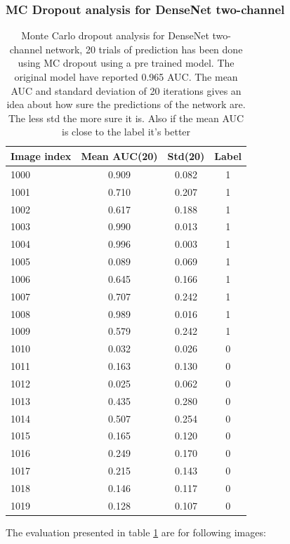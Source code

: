 \subsubsection{MC Dropout analysis for DenseNet two-channel}
\begin{table}
\centering
\begin{tabular}{|l | c| c| c|} 
 \hline\hline
 Image index & Mean AUC(20) & Std(20) & Label\\ \hline
 1000 & 0.909 & 0.082 &    1 \\
1001 & 0.710 & 0.207 &    1\\
1002 & 0.617 & 0.188 &    1\\
1003 & 0.990 & 0.013 &    1\\
1004 & 0.996 & 0.003 &    1\\
1005 & 0.089 & 0.069 &    1\\
1006 & 0.645 & 0.166 &    1\\
1007 & 0.707 & 0.242 &    1\\
1008 & 0.989 & 0.016 &    1\\
1009 & 0.579 & 0.242 &    1\\
1010 & 0.032 & 0.026 &    0\\
1011 & 0.163 & 0.130 &    0\\
1012 & 0.025 & 0.062 &    0\\
1013 & 0.435 & 0.280 &    0\\
1014 & 0.507 & 0.254 &    0\\
1015 & 0.165 & 0.120 &    0\\
1016 & 0.249 & 0.170 &    0\\
1017 & 0.215 & 0.143 &    0\\
1018 & 0.146 & 0.117 &    0\\
1019 & 0.128 & 0.107 &    0\\ \hline \hline
 \end{tabular}
 \caption{Monte Carlo dropout analysis for DenseNet two-channel network, 20 trials of prediction has been done using MC dropout using a pre trained model. The original model have reported 0.965 AUC. 
 The mean AUC and standard deviation of 20 iterations gives an idea about how sure the predictions of the network are. The less std the more sure it is. Also if the mean AUC is close to the label it's better}
\label{table:mcd_dtc_results}
\end{table}

\newpage 

The evaluation presented in table \ref{table:mcd_dtc_results} are for following images:

